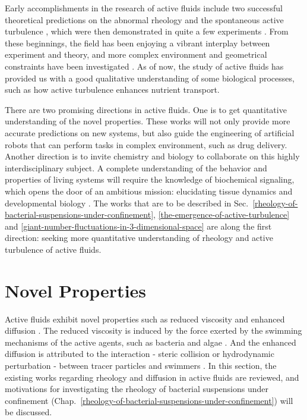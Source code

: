 Early accomplishments in the research of active fluids include two successful theoretical predictions on the abnormal rheology and the spontaneous active turbulence \cite{Hatwalne2004, Simha2002}, which were then demonstrated in quite a few experiments
\cite{Dombrowski2004, Wensink2012, Rafai2010, Sokolov2009, Gachelin2013, Lopez2015}. From these beginnings, the field has been enjoying a vibrant interplay between experiment and theory, and more complex environment and geometrical constraints have been investigated \cite{Ramaswamy2019}. As of now, the study of active fluids has provided us with a good qualitative understanding of some biological processes, such as how active turbulence enhances nutrient transport.

There are two promising directions in active fluids. One is to get quantitative understanding of the novel properties.  These works will not only provide more accurate predictions on new systems, but also guide the engineering of artificial robots that can perform tasks in complex environment, such as drug delivery. Another direction is to invite chemistry and biology to collaborate on this highly interdisciplinary subject. A complete understanding of the behavior and properties of living systems will require the knowledge of biochemical signaling, which opens the door of an ambitious mission: elucidating tissue dynamics and developmental biology \cite{Marchetti2013, Curatolo2020}. The works that are to be described in Sec.~\ref{rheology-of-bacterial-suspensions-under-confinement}, \ref{the-emergence-of-active-turbulence} and \ref{giant-number-fluctuations-in-3-dimensional-space} are along the first direction: seeking more quantitative understanding of rheology and active turbulence of active fluids.

\section{Novel Properties}
\label{emergent-properties}
Active fluids exhibit novel properties such as reduced viscosity and enhanced diffusion  \cite{Ramaswamy2010}. The reduced viscosity is induced by the force exerted by the swimming mechanisms of the active agents, such as bacteria and algae \cite{Saintillan2018}. And the enhanced diffusion is attributed to the interaction - steric collision or hydrodynamic perturbation - between tracer particles and swimmers
\cite{Wu2000, Peng2016, Caspi2000, Morozov2014, Patteson2016, Leptos2009,
 Yang2016, Valeriani2011, Kurtuldu2011}.
In this section, the existing works regarding rheology and diffusion in active fluids are reviewed, and motivations for investigating the rheology of bacterial suspensions under confinement (Chap.~\ref{rheology-of-bacterial-suspensions-under-confinement}) will be discussed.


